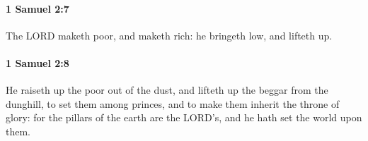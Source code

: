 		\paragraph{1 Samuel 2:7} %
			\label{1SAMUEL-2-7}

			The LORD maketh poor, and maketh rich: he bringeth low, and lifteth up.


		\paragraph{1 Samuel 2:8} %
			\label{1SAMUEL-2-8}

			He raiseth up the poor out of the dust, and lifteth up the beggar from the dunghill, to set them among princes, and to make them inherit the throne of glory: for the pillars of the earth are the LORD’s, and he hath set the world upon them.


